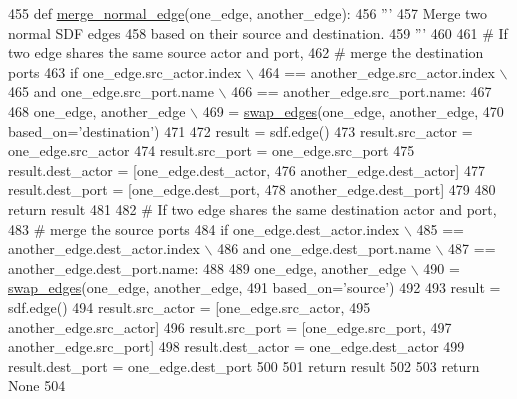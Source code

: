 \begin{DoxyCode}
455   \textcolor{keyword}{def }\hyperlink{namespacesylva_1_1glic_1_1glic_a1d03fa1322fc331579ff650ea5612ce8}{merge\_normal\_edge}(one\_edge, another\_edge):
456     \textcolor{stringliteral}{'''}
457 \textcolor{stringliteral}{      Merge two normal SDF edges}
458 \textcolor{stringliteral}{      based on their source and destination.}
459 \textcolor{stringliteral}{    '''}
460 
461     \textcolor{comment}{# If two edge shares the same source actor and port,}
462     \textcolor{comment}{# merge the destination ports}
463     \textcolor{keywordflow}{if} one\_edge.src\_actor.index \(\backslash\)
464             == another\_edge.src\_actor.index \(\backslash\)
465             \textcolor{keywordflow}{and} one\_edge.src\_port.name \(\backslash\)
466             == another\_edge.src\_port.name:
467 
468       one\_edge, another\_edge \(\backslash\)
469           = \hyperlink{namespacesylva_1_1glic_1_1glic_aa33f0fa18db2dc181313352cfdbc0cca}{swap\_edges}(one\_edge, another\_edge,
470                        based\_on=\textcolor{stringliteral}{'destination'})
471 
472       result = sdf.edge()
473       result.src\_actor = one\_edge.src\_actor
474       result.src\_port = one\_edge.src\_port
475       result.dest\_actor = [one\_edge.dest\_actor,
476                            another\_edge.dest\_actor]
477       result.dest\_port = [one\_edge.dest\_port,
478                           another\_edge.dest\_port]
479 
480       \textcolor{keywordflow}{return} result
481 
482     \textcolor{comment}{# If two edge shares the same destination actor and port,}
483     \textcolor{comment}{# merge the source ports}
484     \textcolor{keywordflow}{if} one\_edge.dest\_actor.index \(\backslash\)
485             == another\_edge.dest\_actor.index \(\backslash\)
486             \textcolor{keywordflow}{and} one\_edge.dest\_port.name \(\backslash\)
487             == another\_edge.dest\_port.name:
488 
489       one\_edge, another\_edge \(\backslash\)
490           = \hyperlink{namespacesylva_1_1glic_1_1glic_aa33f0fa18db2dc181313352cfdbc0cca}{swap\_edges}(one\_edge, another\_edge,
491                        based\_on=\textcolor{stringliteral}{'source'})
492 
493       result = sdf.edge()
494       result.src\_actor = [one\_edge.src\_actor,
495                           another\_edge.src\_actor]
496       result.src\_port = [one\_edge.src\_port,
497                          another\_edge.src\_port]
498       result.dest\_actor = one\_edge.dest\_actor
499       result.dest\_port = one\_edge.dest\_port
500 
501       \textcolor{keywordflow}{return} result
502 
503     \textcolor{keywordflow}{return} \textcolor{keywordtype}{None}
504 
\end{DoxyCode}
\mbox{\label{namespacesylva_1_1glic_1_1glic_a3230a4ec28a3787a073288b4532675cc}} 
